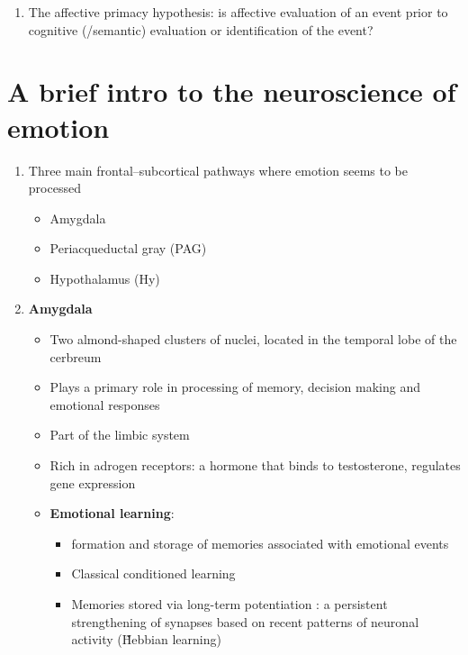 \documentclass[12pt,letterpaper,table,svgnames,dvipsnames]{article}
\begin{document}
\begin{enumerate}[noitemsep]
    \item The affective primacy hypothesis: is affective evaluation of an event prior to cognitive (/semantic) evaluation or identification of the event?

\end{enumerate}


\section{A brief intro to the neuroscience of emotion}


\begin{enumerate}
    \item Three main frontal--subcortical pathways where emotion seems to be processed
        \begin{itemize}
            \item Amygdala
            \item Periacqueductal gray (PAG)
            \item Hypothalamus (Hy)
        \end{itemize}


    \item \textbf{Amygdala}
        \begin{itemize}
            \item Two almond-shaped clusters of nuclei, located in the temporal lobe of the cerbreum
            \item Plays a primary role in processing of memory, decision making and emotional responses
            \item Part of the limbic system
            \item Rich in adrogen receptors: a hormone that binds to testosterone, regulates gene expression
            \item \textbf{Emotional learning}:
                \begin{itemize}
                    \item formation and storage of memories associated with emotional events
                    \item Classical conditioned learning
                    \item Memories stored via long-term potentiation : a persistent strengthening of synapses based on recent patterns of neuronal activity (\~ Hebbian learning)
                \end{itemize}
        \end{itemize}


\end{enumerate}
\end{document}
